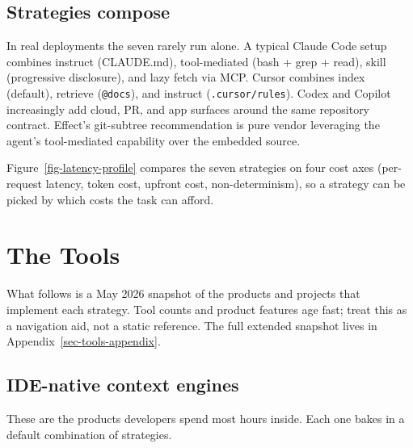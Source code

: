 \documentclass[
  11pt,
  letterpaper,
  numbers=noendperiod,
  parskip=half]{scrartcl}
\begin{document}
\subsection{Strategies compose}\label{sec-strat-compose}

In real deployments the seven rarely run alone. A typical Claude Code
setup combines instruct (CLAUDE.md), tool-mediated (bash + grep +
read), skill (progressive disclosure), and lazy fetch via MCP. Cursor
combines index (default), retrieve (\texttt{@docs}), and instruct
(\texttt{.cursor/rules}). Codex and Copilot increasingly add cloud,
PR, and app surfaces around the same repository contract. Effect's
git-subtree recommendation is pure vendor leveraging the agent's
tool-mediated capability over the embedded source.

Figure~\ref{fig-latency-profile} compares the seven strategies on four
cost axes (per-request latency, token cost, upfront cost,
non-determinism), so a strategy can be picked by which costs the task
can afford.

\section{The Tools}\label{sec-tools}

What follows is a May 2026 snapshot of the products and projects that
implement each strategy. Tool counts and product features age fast;
treat this as a navigation aid, not a static reference. The full
extended snapshot lives in Appendix~\ref{sec-tools-appendix}.

\subsection{IDE-native context engines}\label{sec-tools-ide}

These are the products developers spend most hours inside. Each one
bakes in a default combination of strategies.
\end{document}

